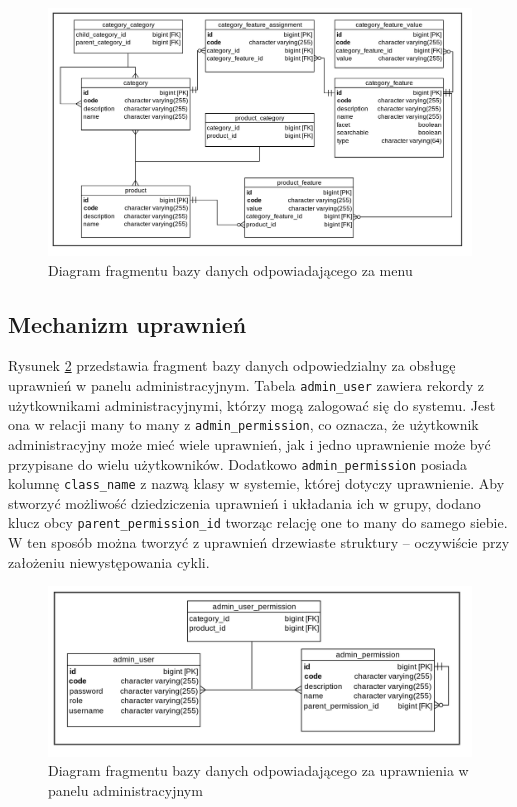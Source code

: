 \begin{figure}
	\begin{center}
		\includegraphics[scale=0.3]{db_sysKlas.png}
	\end{center}
	\caption{{\color{black}Diagram fragmentu bazy danych odpowiadającego za menu}} \label{db_sysKlas}
\end{figure}

\subsection{Mechanizm uprawnień}
Rysunek \ref{db_uprawnienia} przedstawia fragment bazy danych odpowiedzialny za obsługę uprawnień w panelu administracyjnym. Tabela \texttt{admin\_user} zawiera rekordy z użytkownikami administracyjnymi, którzy mogą zalogować się do systemu. Jest ona w relacji many to many z \texttt{admin\_permission}, co oznacza, że użytkownik administracyjny może mieć wiele uprawnień, jak i jedno uprawnienie może być przypisane do wielu użytkowników. Dodatkowo \texttt{admin\_permission} posiada kolumnę \texttt{class\_name} z nazwą klasy w systemie, której dotyczy uprawnienie. Aby stworzyć możliwość dziedziczenia uprawnień i układania ich w grupy, dodano klucz obcy \texttt{parent\_permission\_id} tworząc relację one to many do samego siebie. W ten sposób można tworzyć z uprawnień drzewiaste struktury -- oczywiście przy założeniu niewystępowania cykli. 

\begin{figure}
	\begin{center}
		\includegraphics[scale=0.3]{db_uprawnienia.png}
	\end{center}
	\caption{{\color{black}Diagram fragmentu bazy danych odpowiadającego za uprawnienia w panelu administracyjnym}} \label{db_uprawnienia}
\end{figure}

